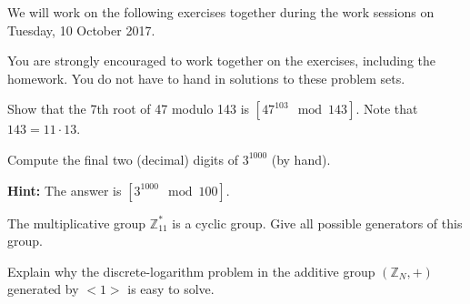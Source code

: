 \documentclass[a4paper,10pt,landscape,twocolumn]{scrartcl}
\newcommand\worksession{Tuesday, 10 October 2017}
\begin{document}
\problems

{\sffamily\noindent
We will work on the following exercises together during the work sessions on \worksession.

You are strongly encouraged to work together on the exercises, including the homework. You do not have to hand in solutions to these problem sets.}


\begin{exercise}
Show that the 7th root of 47 modulo 143 is $[47^{103} \mod 143]$. Note that $143=11\cdot 13$.
\end{exercise}

\begin{exercise}
Compute the final two (decimal) digits of $3^{1000}$ (by hand).

\textbf{Hint:} The answer is $[3^{1000} \mod 100]$.
\end{exercise}

\begin{exercise}
The multiplicative group $\mathbb{Z}^*_{11}$ is a cyclic group. Give all possible generators of this group.
\end{exercise}

\begin{exercise}
Explain why the discrete-logarithm problem in the additive group $(\mathbb{Z}_N, +)$ generated by $<1>$ is easy to solve.
\end{exercise}
\end{document}
